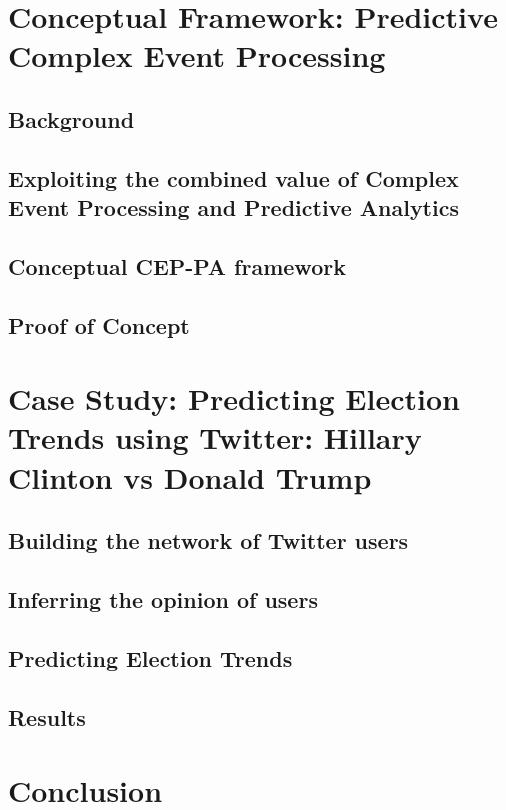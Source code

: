\documentclass[runningheads]{llncs}
\begin{document}
\section{Conceptual Framework: Predictive Complex Event Processing}
\subsection{Background}
\subsection{Exploiting the combined value of Complex Event Processing and Predictive Analytics}
\subsection{Conceptual CEP-PA framework}
\subsection{Proof of Concept}
\section{Case Study: Predicting Election Trends using Twitter: Hillary Clinton vs Donald Trump}
\subsection{Building the network of Twitter users}
\subsection{Inferring the opinion of users}
\subsection{Predicting Election Trends}
\subsection{Results}
\section{Conclusion}


\end{document}
